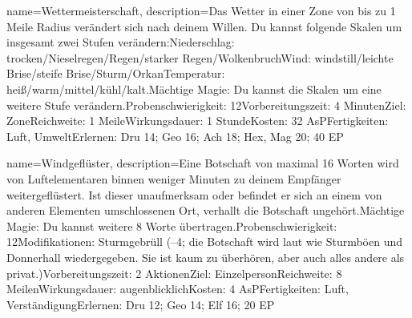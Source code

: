 {
    name={Wettermeisterschaft},
    description={Das Wetter in einer Zone von bis zu 1 Meile Radius verändert sich nach deinem Willen. Du kannst folgende Skalen um insgesamt zwei Stufen verändern:\newline Niederschlag: trocken/Nieselregen/Regen/starker Regen/Wolkenbruch\newline Wind: windstill/leichte Brise/steife Brise/Sturm/Orkan\newline Temperatur: heiß/warm/mittel/kühl/kalt.\newline Mächtige Magie: Du kannst die Skalen um eine weitere Stufe verändern.\newline Probenschwierigkeit: 12\newline Vorbereitungszeit: 4 Minuten\newline Ziel: Zone\newline Reichweite: 1 Meile\newline Wirkungsdauer: 1 Stunde\newline Kosten: 32 AsP\newline Fertigkeiten: Luft, Umwelt\newline Erlernen: Dru 14; Geo 16; Ach 18; Hex, Mag 20; 40 EP}
}


{
    name={Windgeflüster},
    description={Eine Botschaft von maximal 16 Worten wird von Luftelementaren binnen weniger Minuten zu deinem Empfänger weitergeflüstert. Ist dieser unaufmerksam oder befindet er sich an einem von anderen Elementen umschlossenen Ort, verhallt die Botschaft ungehört.\newline Mächtige Magie: Du kannst weitere 8 Worte übertragen.\newline Probenschwierigkeit: 12\newline Modifikationen: Sturmgebrüll (–4; die Botschaft wird laut wie Sturmböen und Donnerhall wiedergegeben. Sie ist kaum zu überhören, aber auch alles andere als privat.)\newline Vorbereitungszeit: 2 Aktionen\newline Ziel: Einzelperson\newline Reichweite: 8 Meilen\newline Wirkungsdauer: augenblicklich\newline Kosten: 4 AsP\newline Fertigkeiten: Luft, Verständigung\newline Erlernen: Dru 12; Geo 14; Elf 16; 20 EP}
}



